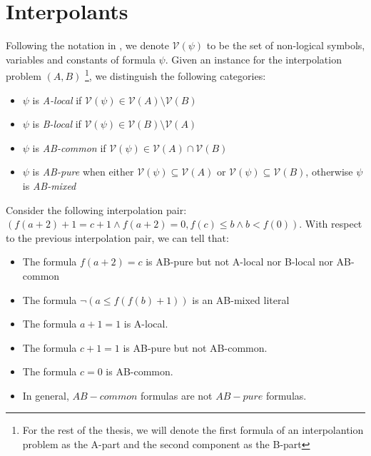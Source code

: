 \section{Interpolants}

Following the notation in \cite{10.1007/11532231_26}, we denote 
$\mathcal{V}(\psi)$ to be the set of non-logical symbols, variables
and constants of formula $\psi$. Given an instance for the interpolation
problem $(A, B)$ \footnote{For the rest of the thesis, we will denote the 
  first formula of an interpolantion problem as the A-part 
and the second component as the B-part}, 
we distinguish the following categories:

\begin{itemize}
  \item $\psi$ is \emph{A-local} if $\mathcal{V}(\psi) \in 
    \mathcal{V}(A) \setminus \mathcal{V}(B)$
  \item $\psi$ is \emph{B-local} if $\mathcal{V}(\psi) \in 
    \mathcal{V}(B) \setminus \mathcal{V}(A)$
  \item $\psi$ is \emph{AB-common} if $\mathcal{V}(\psi) \in
    \mathcal{V}(A) \cap \mathcal{V}(B)$
  \item $\psi$ is \emph{AB-pure} when either $\mathcal{V}(\psi) \subseteq 
    \mathcal{V}(A)$ or $\mathcal{V}(\psi) \subseteq \mathcal{V}(B)$, otherwise
    $\psi$ is \emph{AB-mixed}
\end{itemize}

\begin{example} \label{first_example}

  Consider the following interpolation pair: $(f(a + 2) + 1 = c + 1
    \land f(a + 2) = 0
  , f(c) \leq b \land b < f(0))$. With respect to the previous 
  interpolation pair, we can tell that:
  \begin{itemize}
    \item The formula $f(a + 2) = c$ is 
      AB-pure but not A-local nor B-local nor AB-common
    \item The formula $\neg(a \leq f(f(b) + 1))$ is an AB-mixed
      literal
    \item The formula $a + 1 = 1$ is A-local.
    \item The formula $c + 1 = 1$ is AB-pure but not AB-common.
    \item The formula $c = 0$ is AB-common.
    \item In general, $AB-common$ formulas are not $AB-pure$ formulas.
  \end{itemize}
\end{example}

